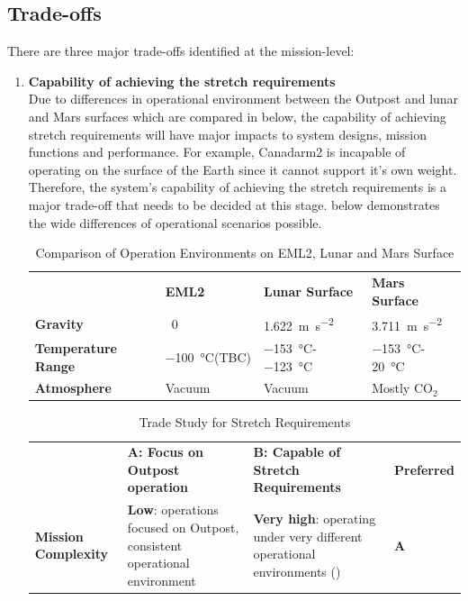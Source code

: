 \documentclass[12pt, letter]{article}
\begin{document}
\subsection{Trade-offs}
\label{tradeoffs}
There are three major trade-offs identified at the mission-level:
\begin{enumerate}
\item{\textbf{Capability of achieving the stretch requirements}\\
Due to differences in operational environment between the Outpost and lunar and Mars surfaces which are compared in  below, the capability of achieving stretch requirements will have major impacts to system designs, mission functions and performance.  For example, Canadarm2 is incapable of operating on the surface of the Earth since it cannot support it's own weight.\cite{CADR1} Therefore, the system's capability of achieving the stretch requirements is a major trade-off that needs to be decided at this stage.  below demonstrates the wide differences of operational scenarios possible.
\begin{table}[H]
\centering
\caption{Comparison of Operation Environments on EML2, Lunar and Mars Surface}
\label{env_comp}
\begin{tabular}{|l|l|l|l|}
\hline
                   	&   \textbf{EML2}	&	\textbf{Lunar Surface}\cite{moonfacts}  &   \textbf{Mars Surface}\cite{mars}	\\\hhline{|=|=|=|=|}
\textbf{Gravity}	&   ~0			&	\SI{1.622}{\m\per\square\s}    		&   \SI{3.711}{\m\per\square\s}		\\\hline
\textbf{Temperature Range}	&	\SI{-100}{\celsius}(TBC)	&	\SI{-153}{\celsius}-\SI{-123}{\celsius}	&	\SI{-153}{\celsius}-\SI{20}{\celsius}	\\\hline
\textbf{Atmosphere}	&	Vacuum	&	Vacuum	&	Mostly CO$_2$     \\\hline
\end{tabular}
\end{table}
\begin{table}[H]
\centering
\caption{Trade Study for Stretch Requirements}
\label{stretch}
\begin{tabular}{|P{3cm}|P{4.3cm}|P{4.3cm}|l|}
\hline
	&	\textbf{A: Focus on Outpost operation}	&	\textbf{B: Capable of Stretch Requirements}	&	\textbf{Preferred}	\\\hhline{|=|=|=|=|}
\textbf{Mission Complexity}	&	\textbf{Low}: operations focused on Outpost, consistent operational environment	&	\textbf{Very high}: operating under very different operational environments ()	&	\textbf{A}	\\\hline

\end{tabular}
\end{table}}
\end{enumerate}
\end{document}
